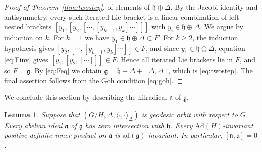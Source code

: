 \documentclass[12pt]{amsart}
\theoremstyle{plain}
\newtheorem{lemma}[theorem]{Lemma}
\theoremstyle{definition}
\theoremstyle{remark}
\newcommand{\alg}[1]{\mathfrak{#1}}
\begin{document}
\begin{proof}[Proof of Theorem~\ref{thm:twostep}]
of elements of $\alg{h}\oplus\Delta$. By the Jacobi identity and antisymmetry, every such iterated
Lie bracket is a linear combination of left-nested brackets
$[y_1,[y_2,[\cdots,[y_{k-1},y_k]\cdots]]]$ with $y_i\in\alg{h}\oplus\Delta$. We argue by induction
on $k$. For $k=1$ we have $y_1\in\alg{h}\oplus\Delta\subset F$. For $k\ge2$, the induction
hypothesis gives $[y_2,[\cdots,[y_{k-1},y_k]\cdots]]\in F$, and since $y_1\in\alg{h}\oplus\Delta$,
equation \eqref{eq:Finv} gives $[y_1,[y_2,[\cdots]]]\in F$. Hence all iterated Lie brackets lie in
$F$, and so $F=\alg{g}$. By \eqref{eq:Feq} we obtain
$\alg{g}=\alg{h}+\Delta+[\Delta,\Delta]$, which is \eqref{eq:twostep}. The final assertion follows
from the Goh condition \eqref{eq:goh}.
\end{proof}

We conclude this section by describing the nilradical $\alg{n}$ of $\alg{g}$.

\begin{lemma}\label{lem:abelian}
Suppose that $(G/H,\Delta,\langle\cdot,\cdot\rangle_\Delta)$ is geodesic orbit with respect to
$G$. Every abelian ideal $\alg{a}$ of $\alg{g}$ has zero intersection with $\alg{h}$. Every
$\mathrm{Ad}(H)$-invariant positive definite inner product on $\alg{a}$ is
$\mathrm{ad}(\alg{g})$-invariant. In particular, $[\alg{n},\alg{a}]=0$.
\end{lemma}
\end{document}
